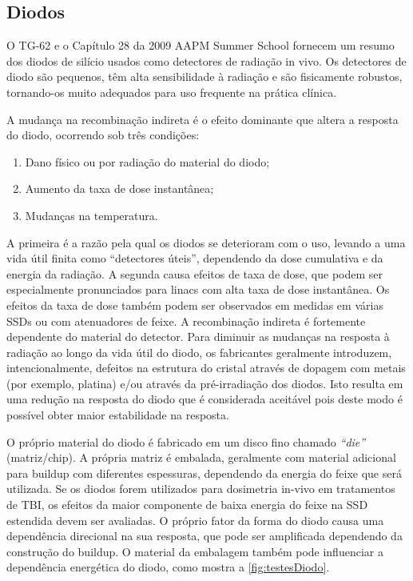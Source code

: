 \documentclass[11pt,a4paper]{article}
\newcounter{exemplo}
\begin{document}
\subsection*{Diodos}

	O TG-62 e o Capítulo 28 da 2009 AAPM Summer School fornecem um resumo dos diodos de silício usados como detectores de radiação in vivo. Os detectores de diodo são pequenos, têm alta sensibilidade à radiação e são fisicamente robustos, tornando-os muito adequados para uso frequente na prática clínica.

	A mudança na recombinação indireta é o efeito dominante que altera a resposta do diodo, ocorrendo sob três condições:

	\begin{enumerate}[label=\textcolor{CarnationPink}{\arabic*${}^\circ $}]
		\item Dano físico ou por radiação do material do diodo;
		\item Aumento da taxa de dose instantânea;
		\item Mudanças na temperatura.
	\end{enumerate}

	A primeira é a razão pela qual os diodos se deterioram com o uso, levando a uma vida útil finita como ``detectores úteis'', dependendo da dose cumulativa e da energia da radiação. A segunda causa efeitos de taxa de dose, que podem ser especialmente pronunciados para linacs com alta taxa de dose instantânea. Os efeitos da taxa de dose também podem ser observados em medidas em várias SSDs ou com atenuadores de feixe. A recombinação indireta é fortemente dependente do material do detector. Para diminuir as mudanças na resposta à radiação ao longo da vida útil do diodo, os fabricantes geralmente introduzem, intencionalmente, defeitos na estrutura do cristal através de dopagem com metais (por exemplo, platina) e/ou através da pré-irradiação dos diodos. Isto resulta em uma redução na resposta do diodo que é considerada aceitável pois deste modo é possível obter maior estabilidade na resposta.

	O próprio material do diodo é fabricado em um disco fino chamado \textit{``die''} (matriz/chip). A própria matriz é embalada, geralmente com material adicional para buildup com diferentes espessuras, dependendo da energia do feixe que será utilizada. Se os diodos forem utilizados para dosimetria in-vivo em tratamentos de TBI, os efeitos da maior componente de baixa energia do feixe na SSD estendida devem ser avaliadas. O próprio fator da forma do diodo causa uma dependência direcional na sua resposta, que pode ser amplificada dependendo da construção do buildup. O material da embalagem também pode influenciar a dependência energética do diodo, como mostra a \ref{fig:testesDiodo}.
\end{document}
